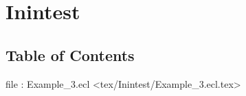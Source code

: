 \chapter*{Inintest}


\section*{Table of Contents}
\par
file : Example\_3.ecl <tex/Inintest/Example\_3.ecl.tex>  



